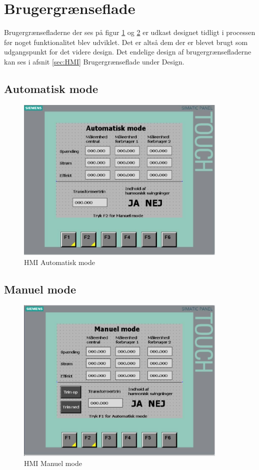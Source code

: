 
\section{Brugergrænseflade}
Brugergrænsefladerne der ses på figur \ref{fig:HMIAutomatikMode} og \ref{fig:HMIManuelMode} er udkast designet tidligt i processen før noget funktionalitet blev udviklet. Det er altså dem der er blevet brugt som udgangspunkt for det videre design. Det endelige design af brugergrænsefladerne kan ses i afsnit \ref{sec:HMI} Brugergrænseflade under Design.

\subsection{Automatisk mode}
\begin{figure}[H] %
	\centering
	\includegraphics[width=0.9\textwidth]{Figure/HMIAutomatiskMode}
	\caption{HMI Automatisk mode}
	\label{fig:HMIAutomatikMode}
\end{figure}


\subsection{Manuel mode}
\begin{figure}[H] %
	\centering
	\includegraphics[width=0.9\textwidth]{Figure/HMIManuelMode}
	\caption{HMI Manuel mode}
	\label{fig:HMIManuelMode}
\end{figure}